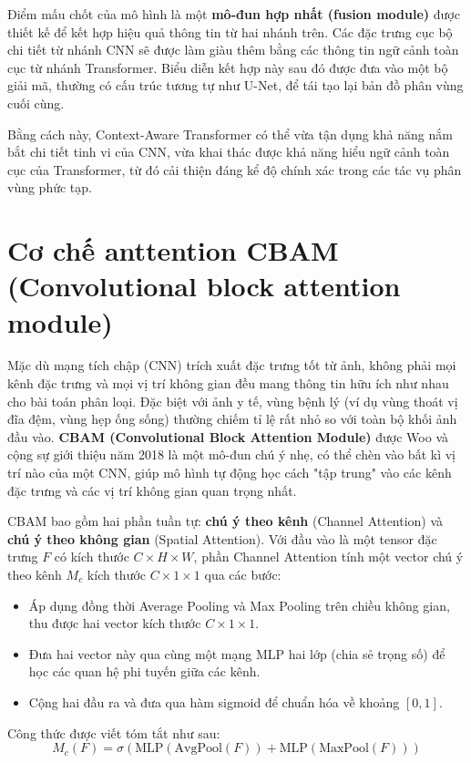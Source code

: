 Điểm mấu chốt của mô hình là một \textbf{mô-đun hợp nhất (fusion module)} được thiết kế để kết hợp hiệu quả thông tin từ hai nhánh trên. Các đặc trưng cục bộ chi tiết từ nhánh CNN sẽ được làm giàu thêm bằng các thông tin ngữ cảnh toàn cục từ nhánh Transformer. Biểu diễn kết hợp này sau đó được đưa vào một bộ giải mã, thường có cấu trúc tương tự như U-Net, để tái tạo lại bản đồ phân vùng cuối cùng.

Bằng cách này, Context-Aware Transformer có thể vừa tận dụng khả năng nắm bắt chi tiết tinh vi của CNN, vừa khai thác được khả năng hiểu ngữ cảnh toàn cục của Transformer, từ đó cải thiện đáng kể độ chính xác trong các tác vụ phân vùng phức tạp.

\section{Cơ chế anttention CBAM (Convolutional block attention module)}
Mặc dù mạng tích chập (CNN) trích xuất đặc trưng tốt từ ảnh, không phải mọi kênh đặc trưng và mọi vị trí không gian đều mang thông tin hữu ích như nhau cho bài toán phân loại. Đặc biệt với ảnh y tế, vùng bệnh lý (ví dụ vùng thoát vị đĩa đệm, vùng hẹp ống sống) thường chiếm tỉ lệ rất nhỏ so với toàn bộ khối ảnh đầu vào. \textbf{CBAM (Convolutional Block Attention Module)} được Woo và cộng sự \cite{woo2018cbam} giới thiệu năm 2018 là một mô-đun chú ý nhẹ, có thể chèn vào bất kì vị trí nào của một CNN, giúp mô hình tự động học cách "tập trung" vào các kênh đặc trưng và các vị trí không gian quan trọng nhất.

CBAM bao gồm hai phần tuần tự: \textbf{chú ý theo kênh} (Channel Attention) và \textbf{chú ý theo không gian} (Spatial Attention). Với đầu vào là một tensor đặc trưng $F$ có kích thước $C \times H \times W$, phần Channel Attention tính một vector chú ý theo kênh $M_c$ kích thước $C \times 1 \times 1$ qua các bước:
\begin{itemize}
    \item Áp dụng đồng thời Average Pooling và Max Pooling trên chiều không gian, thu được hai vector kích thước $C \times 1 \times 1$.
    \item Đưa hai vector này qua cùng một mạng MLP hai lớp (chia sẻ trọng số) để học các quan hệ phi tuyến giữa các kênh.
    \item Cộng hai đầu ra và đưa qua hàm sigmoid để chuẩn hóa về khoảng $[0, 1]$.
\end{itemize}

Công thức được viết tóm tắt như sau:
$$M_c(F) = \sigma\left(\text{MLP}(\text{AvgPool}(F)) + \text{MLP}(\text{MaxPool}(F))\right)$$

